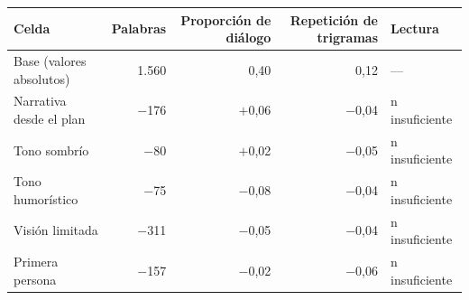 \begin{tabular}{@{}lrrrl@{}}
\toprule
Celda & Palabras & Proporción de diálogo & Repetición de trigramas & Lectura \\
\midrule
Base (valores absolutos) & 1.560 & 0,40 & 0,12 & --- \\
Narrativa desde el plan & $-$176 & $+$0,06 & $-$0,04 & n insuficiente \\
Tono sombrío & $-$80 & $+$0,02 & $-$0,05 & n insuficiente \\
Tono humorístico & $-$75 & $-$0,08 & $-$0,04 & n insuficiente \\
Visión limitada & $-$311 & $-$0,05 & $-$0,04 & n insuficiente \\
Primera persona & $-$157 & $-$0,02 & $-$0,06 & n insuficiente \\
\bottomrule
\end{tabular}

